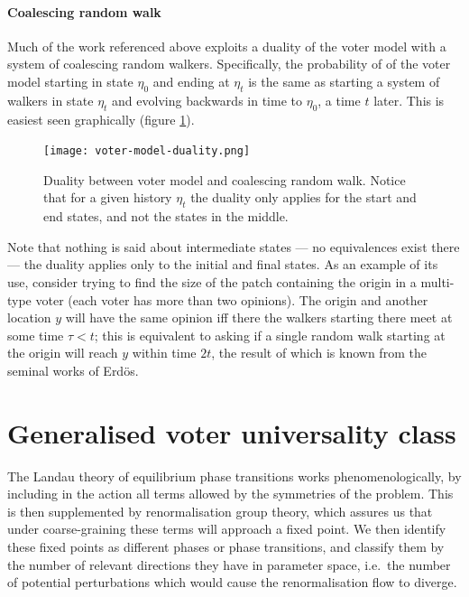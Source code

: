 \documentclass[10pt,english]{report}
\begin{document}
\paragraph{Coalescing random walk}

Much of the work referenced above exploits a duality of the voter model with a system of coalescing random walkers. Specifically, the probability of of the voter model starting in state $\eta_0$ and ending at $\eta_t$ is the same as starting a system of walkers in state $\eta_t$ and evolving backwards in time to $\eta_0$, a time $t$ later. This is easiest seen graphically (figure \ref{fig:voter-model-duality}).

\begin{figure}[htb]
	\centering
	\texttt{[image: voter-model-duality.png]}
	\caption{\label{fig:voter-model-duality}Duality between voter model and coalescing random walk. Notice that for a given history $\eta_t$ the duality only applies for the start and end states, and not the states in the middle.}
\end{figure}

Note that nothing is said about intermediate states --- no equivalences exist there --- the duality applies only to the initial and final states. As an example of its use, consider trying to find the size of the patch containing the origin in a multi-type voter (each voter has more than two opinions). The origin and another location $y$ will have the same opinion iff there the walkers starting there meet at some time $\tau < t$; this is equivalent to asking if a single random walk starting at the origin will reach $y$ within time $2t$, the result of which is known from the seminal works of Erd\"os.

\section{Generalised voter universality class}

The Landau theory of equilibrium phase transitions works phenomenologically, by including in the action all terms allowed by the symmetries of the problem. This is then supplemented by renormalisation group theory, which assures us that under coarse-graining these terms will approach a fixed point. We then identify these fixed points as different phases or phase transitions, and classify them by the number of relevant directions they have in parameter space, i.e.\ the number of potential perturbations which would cause the renormalisation flow to diverge.
\end{document}
